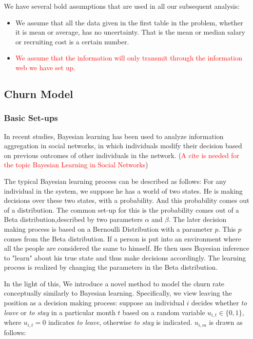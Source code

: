 \documentclass[tcn = 37075, sheet = true, abstract = true]{mcmthesis}
\begin{document}
We have several bold assumptions that are used in all our subsequent analysis:
\begin{itemize}
\item We assume that all the data given in the first table in the problem, whether it is mean or average, has no uncertainty. That is the mean or median salary or recruiting cost is a certain number.
\item \textcolor{red}{We assume that the information will only transmit through the information web we have set up.}
\end{itemize}

\subsection{Churn Model}

\subsubsection{Basic Set-ups}

In recent studies, Bayesian learning has been used to analyze information aggregation in social networks, in which individuals modify their decision based on previous outcomes of other individuals in the network. (\textcolor{red}{A cite is needed for the topic Bayesian Learning in Social Networks})

The typical Bayesian learning process can be described as follows: For any individual in the system, we suppose he has a world of two states. He is making decisions over these two states, with a probability. And this probability comes out of a distribution. The common set-up for this is the probability comes out of a Beta distribution,described by two parameters $\alpha$ and $\beta$. The later decision making process is based on a Bernoulli Distribution with a parameter $p$. This $p$ comes from the Beta distribution. If a person is put into an environment where all the people are considered the same to himself. He then uses Bayesian inference to "learn" about his true state and thus make decisions accordingly. The learning process is realized by changing the parameters in the Beta distribution.

In the light of this, We introduce a novel method to model the churn rate conceptually similarly to Bayesian learning. Specifically, we view leaving the position as a decision making process: suppose an individual $i$ decides whether \textit{to leave} or \textit{to stay} in a particular month $t$ based on a random variable $u_{i,t} \in \{0, 1\}$, where $u_{i,t} = 0$ indicates \textit{to leave}, otherwise \textit{to stay} is indicated. $u_{i, m}$ is drawn as follows:
\end{document}
